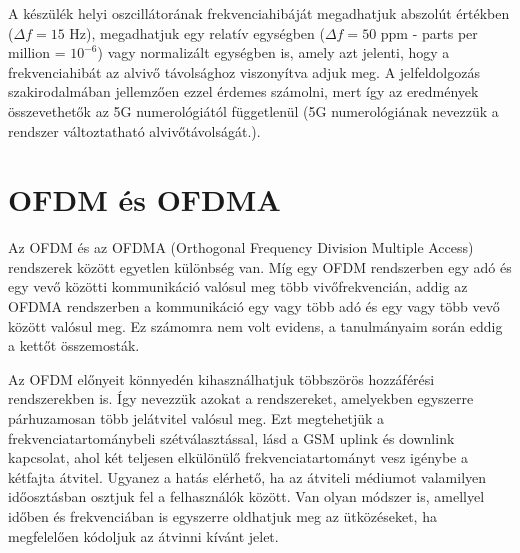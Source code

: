 A készülék helyi oszcillátorának frekvenciahibáját megadhatjuk abszolút értékben ($ \Delta f = 15 \text{ Hz}$), megadhatjuk egy relatív egységben ($\Delta f = 50 \text{ ppm}$ - parts per million = $10^{-6}$) vagy normalizált egységben is, amely azt jelenti, hogy a frekvenciahibát az alvivő távolsághoz viszonyítva adjuk meg.
A jelfeldolgozás szakirodalmában jellemzően ezzel érdemes számolni, mert így az eredmények összevethetők az 5G numerológiától függetlenül (5G numerológiának nevezzük a rendszer változtatható alvivőtávolságát.).

\section{OFDM és OFDMA}

Az OFDM és az OFDMA (Orthogonal Frequency Division Multiple Access) rendszerek között egyetlen különbség van.
Míg egy OFDM rendszerben egy adó és egy vevő közötti kommunikáció valósul meg több vivőfrekvencián, addig az OFDMA rendszerben a kommunikáció egy vagy több adó és egy vagy több vevő között valósul meg.
Ez számomra nem volt evidens, a tanulmányaim során eddig a kettőt összemosták.

Az OFDM előnyeit könnyedén kihasználhatjuk többszörös hozzáférési rendszerekben is.
Így nevezzük azokat a rendszereket, amelyekben egyszerre párhuzamosan több jelátvitel valósul meg.
Ezt megtehetjük a frekvenciatartománybeli szétválasztással, lásd a GSM uplink és downlink kapcsolat, ahol két teljesen elkülönülő frekvenciatartományt vesz igénybe a kétfajta átvitel. 
Ugyanez a hatás elérhető, ha az átviteli médiumot valamilyen időosztásban osztjuk fel a felhasználók között. 
Van olyan módszer is, amellyel időben és frekvenciában is egyszerre oldhatjuk meg az ütközéseket, ha megfelelően kódoljuk az átvinni kívánt jelet.
